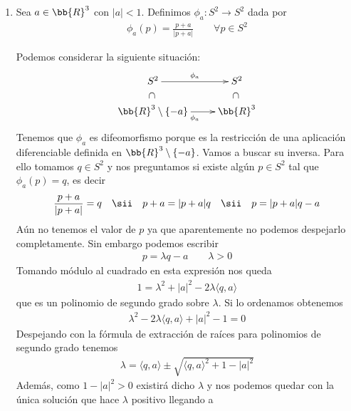 \begin{ejemplo}
\begin{enumerate}
        \item Sea $a\in \bb{R}^3$ con $|a|<1$. Definimos $\phi_a : S^2 \to S^2$ dada por 
        \begin{gather*}
            \phi_a(p) =\frac{p+a}{|p+a|} \qquad \forall p \in S^2
        \end{gather*}
        \begin{solucion}
            Podemos considerar la siguiente situación:
            \begin{gather*}
                \xymatrix@R=5mm{
                    S^2 \ar[r]^{\phi_a} \ar@{}[d]|-*[@]{\subset} & S^2 \ar@{}[d]|-*[@]{\subset}\\
                    \bb{R}^3 \setminus \{-a\} \ar[r]_{\phi_a} & \bb{R}^3
                }
            \end{gather*}
            Tenemos que $\phi_a$ es difeomorfismo porque es la restricción de una aplicación diferenciable definida en $\bb{R}^3\setminus \{-a\}$. Vamos a buscar su inversa. Para ello tomamos $q\in S^2$ y nos preguntamos si existe algún $p\in S^2$ tal que $\phi_a(p)=q$, es decir
            \begin{gather*}
                \frac{p+a}{|p+a|}=q \quad \sii \quad 
                p+a = |p+a|q \quad \sii \quad
                p = |p+a|q-a
            \end{gather*}
            Aún no tenemos el valor de $p$ ya que aparentemente no podemos despejarlo completamente. Sin embargo podemos escribir
            \begin{gather*}
                p = \lambda q - a\qquad \lambda >0
            \end{gather*}
            Tomando módulo al cuadrado en esta expresión nos queda
            \begin{gather*}
                1 = \lambda^2 + |a|^2 -2\lambda \langle q,a \rangle
            \end{gather*}
            que es un polinomio de segundo grado sobre $\lambda$. Si lo ordenamos obtenemos
            \begin{gather*}
                \lambda^2 - 2\lambda \langle q,a\rangle + |a|^2 - 1 = 0
            \end{gather*}
            Despejando con la fórmula de extracción de raíces para polinomios de segundo grado tenemos
            \begin{gather*}
                \lambda = \langle q,a\rangle \pm \sqrt{\langle q,a\rangle^2 + 1 - |a|^2}
            \end{gather*}
            Además, como $1-|a|^2 > 0$ existirá dicho $\lambda$ y nos podemos quedar con la única solución que hace $\lambda$ positivo llegando a 

\end{solucion}
\end{enumerate}
\end{ejemplo}
